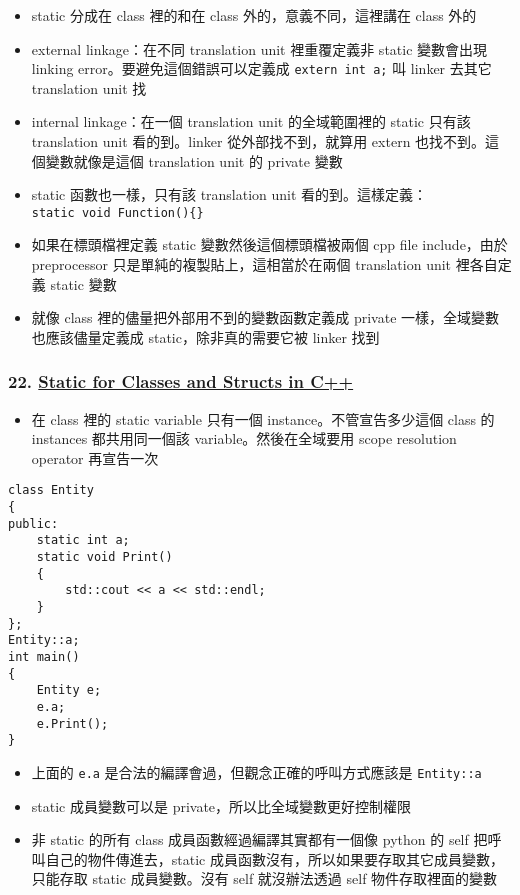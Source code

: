 \documentclass[11pt]{article}
\providecommand{\tightlist}{%
      \setlength{\itemsep}{0pt}\setlength{\parskip}{0pt}}
\begin{document}
\begin{itemize}
\tightlist
\item
  static 分成在 class 裡的和在 class 外的，意義不同，這裡講在 class 外的
\item
  external linkage：在不同 translation unit 裡重覆定義非 static
  變數會出現 linking error。要避免這個錯誤可以定義成
  \texttt{extern\ int\ a;} 叫 linker 去其它 translation unit 找
\item
  internal linkage：在一個 translation unit 的全域範圍裡的 static 只有該
  translation unit 看的到。linker 從外部找不到，就算用 extern
  也找不到。這個變數就像是這個 translation unit 的 private 變數
\item
  static 函數也一樣，只有該 translation unit
  看的到。這樣定義：\texttt{static\ void\ Function()\{\}}
\item
  如果在標頭檔裡定義 static 變數然後這個標頭檔被兩個 cpp file
  include，由於 preprocessor 只是單純的複製貼上，這相當於在兩個
  translation unit 裡各自定義 static 變數
\item
  就像 class 裡的儘量把外部用不到的變數函數定義成 private
  一樣，全域變數也應該儘量定義成 static，除非真的需要它被 linker 找到
\end{itemize}

\hypertarget{static-for-classes-and-structs-in-c}{%
\subsubsection{\texorpdfstring{22.
\href{https://www.youtube.com/watch?v=V-BFlMrBtqQ\&list=PLlrATfBNZ98dudnM48yfGUldqGD0S4FFb\&index=23\&t=0s}{Static
for Classes and Structs in
C++}}{22. Static for Classes and Structs in C++}}\label{static-for-classes-and-structs-in-c}}

\begin{itemize}
\tightlist
\item
  在 class 裡的 static variable 只有一個 instance。不管宣告多少這個
  class 的 instances 都共用同一個該 variable。然後在全域要用 scope
  resolution operator 再宣告一次
\end{itemize}

\begin{verbatim}
class Entity
{
public: 
    static int a;
    static void Print()
    {
        std::cout << a << std::endl;
    }
};
Entity::a;
int main()
{
    Entity e; 
    e.a;
    e.Print();
}
\end{verbatim}

\begin{itemize}
\tightlist
\item
  上面的 \texttt{e.a} 是合法的編譯會過，但觀念正確的呼叫方式應該是
  \texttt{Entity::a}
\item
  static 成員變數可以是 private，所以比全域變數更好控制權限
\item
  非 static 的所有 class 成員函數經過編譯其實都有一個像 python 的 self
  把呼叫自己的物件傳進去，static
  成員函數沒有，所以如果要存取其它成員變數，只能存取 static
  成員變數。沒有 self 就沒辦法透過 self 物件存取裡面的變數
\end{itemize}
\end{document}
